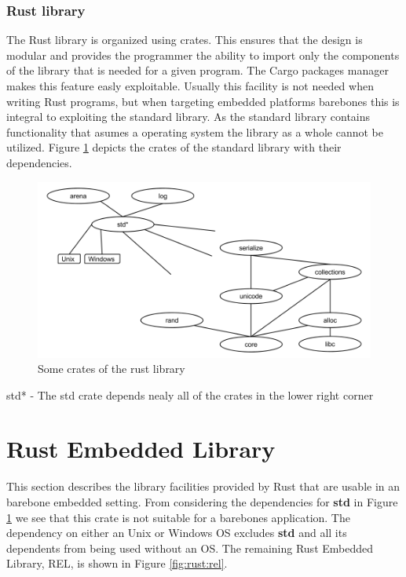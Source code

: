 \subsubsection{Rust library}

The Rust library is organized using crates.
This ensures that the design is modular and provides the programmer the ability to import only the components of the library that is needed for a given program.
The Cargo packages manager makes this feature easly exploitable.
Usually this facility is not needed when writing Rust programs, but when targeting embedded platforms barebones this is integral to exploiting the standard library.
As the standard library contains functionality that asumes a operating system the library as a whole cannot be utilized.
Figure \ref{fig:rust:librust} depicts the crates of the standard library with their dependencies.

\begin{figure}[H]
  \begin{center}
    \includegraphics[scale=0.3]{figures/background/rust/rust-lib.png}
  \end{center}
  \caption{Some crates of the rust library}
  \label{fig:rust:librust}
\end{figure}
std* - The std crate depends nealy all of the crates in the lower right corner

\section{Rust Embedded Library}

This section describes the library facilities provided by Rust that are usable in an barebone embedded setting.
From considering the dependencies for \textbf{std} in Figure \ref{fig:rust:librust} we see that this crate is not suitable for a barebones application.
The dependency on either an Unix or Windows OS excludes \textbf{std} and all its dependents from being used without an OS.
The remaining Rust Embedded Library, REL, is shown in Figure \ref{fig:rust:rel}.

